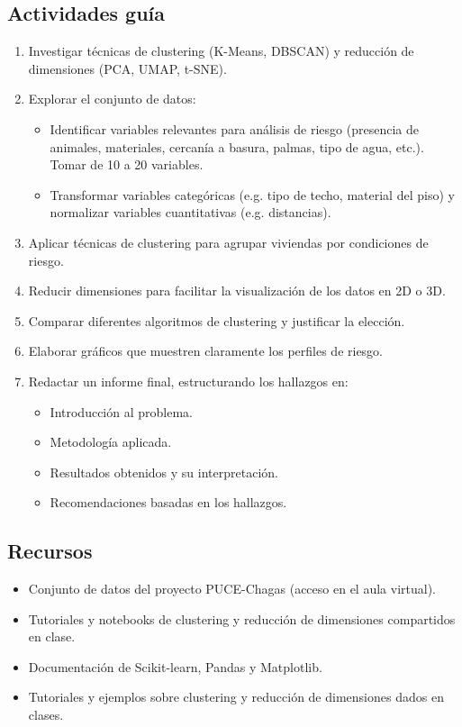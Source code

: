 \documentclass[a4,11pt]{aleph-notas}
\begin{document}
\subsection*{Actividades guía}  
\begin{enumerate}[leftmargin=*, label={{\arabic*.}}]
\item Investigar técnicas de clustering (K-Means, DBSCAN) y reducción de dimensiones (PCA, UMAP, t-SNE).
\item Explorar el conjunto de datos:
    \begin{itemize}
    \item Identificar variables relevantes para análisis de riesgo (presencia de animales, materiales, cercanía a basura, palmas, tipo de agua, etc.). Tomar de 10 a 20 variables.
    \item Transformar variables categóricas (e.g. tipo de techo, material del piso) y normalizar variables cuantitativas (e.g. distancias).
    \end{itemize}
\item Aplicar técnicas de clustering para agrupar viviendas por condiciones de riesgo.
\item Reducir dimensiones para facilitar la visualización de los datos en 2D o 3D.
\item Comparar diferentes algoritmos de clustering y justificar la elección.
\item Elaborar gráficos que muestren claramente los perfiles de riesgo.
\item Redactar un informe final, estructurando los hallazgos en:
    \begin{itemize}[leftmargin=*]
    \item Introducción al problema.
    \item Metodología aplicada.
    \item Resultados obtenidos y su interpretación.
    \item Recomendaciones basadas en los hallazgos.
    \end{itemize}
\end{enumerate}

\subsection*{Recursos}  
\begin{itemize}[leftmargin=*]
\item Conjunto de datos del proyecto PUCE-Chagas (acceso en el aula virtual).
\item Tutoriales y notebooks de clustering y reducción de dimensiones compartidos en clase.
\item Documentación de Scikit-learn, Pandas y Matplotlib.
\item Tutoriales y ejemplos sobre clustering y reducción de dimensiones dados en clases.
\end{itemize}
\end{document}
